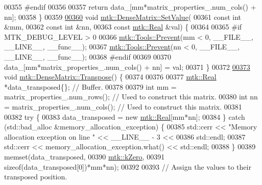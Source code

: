 \begin{DoxyCode}
00355 \textcolor{preprocessor}{  #endif}
00356 
00357   \textcolor{keywordflow}{return} data\_[mm*matrix\_properties\_.num\_cols() + nn];
00358 \}
00359 
\hypertarget{mtk__dense__matrix_8cc_source_l00360}{}\hyperlink{classmtk_1_1DenseMatrix_ae0f873a6d3a734da467cafb817da64ae}{00360} \textcolor{keywordtype}{void}  \hyperlink{classmtk_1_1DenseMatrix_ae0f873a6d3a734da467cafb817da64ae}{mtk::DenseMatrix::SetValue}(
00361     \textcolor{keyword}{const} \textcolor{keywordtype}{int} &mm,
00362     \textcolor{keyword}{const} \textcolor{keywordtype}{int} &nn,
00363     \textcolor{keyword}{const} \hyperlink{group__c01-roots_gac080bbbf5cbb5502c9f00405f894857d}{mtk::Real} &val) \{
00364 
00365 \textcolor{preprocessor}{  #if MTK\_DEBUG\_LEVEL > 0}
00366   \hyperlink{classmtk_1_1Tools_afe5bb096309258e2e72503fd7b41c7e0}{mtk::Tools::Prevent}(mm < 0, \_\_FILE\_\_, \_\_LINE\_\_, \_\_func\_\_);
00367   \hyperlink{classmtk_1_1Tools_afe5bb096309258e2e72503fd7b41c7e0}{mtk::Tools::Prevent}(nn < 0, \_\_FILE\_\_, \_\_LINE\_\_, \_\_func\_\_);
00368 \textcolor{preprocessor}{  #endif}
00369 
00370   data\_[mm*matrix\_properties\_.num\_cols() + nn] = val;
00371 \}
00372 
\hypertarget{mtk__dense__matrix_8cc_source_l00373}{}\hyperlink{classmtk_1_1DenseMatrix_a71d9c07ca66e88d97d1fd5012f43138b}{00373} \textcolor{keywordtype}{void} \hyperlink{classmtk_1_1DenseMatrix_a71d9c07ca66e88d97d1fd5012f43138b}{mtk::DenseMatrix::Transpose}() \{
00374 
00376 
00377   \hyperlink{group__c01-roots_gac080bbbf5cbb5502c9f00405f894857d}{mtk::Real} *data\_transposed\{\}; \textcolor{comment}{// Buffer.}
00378 
00379   \textcolor{keywordtype}{int} mm = matrix\_properties\_.num\_rows(); \textcolor{comment}{// Used to construct this matrix.}
00380   \textcolor{keywordtype}{int} nn = matrix\_properties\_.num\_cols(); \textcolor{comment}{// Used to construct this matrix.}
00381 
00382   \textcolor{keywordflow}{try} \{
00383     data\_transposed = \textcolor{keyword}{new} \hyperlink{group__c01-roots_gac080bbbf5cbb5502c9f00405f894857d}{mtk::Real}[mm*nn];
00384   \} \textcolor{keywordflow}{catch} (std::bad\_alloc &memory\_allocation\_exception) \{
00385     std::cerr << \textcolor{stringliteral}{"Memory allocation exception on line "} << \_\_LINE\_\_ - 3 <<
00386       std::endl;
00387     std::cerr << memory\_allocation\_exception.what() << std::endl;
00388   \}
00389   memset(data\_transposed,
00390          \hyperlink{group__c01-roots_ga59a451a5fae30d59649bcda274fea271}{mtk::kZero},
00391          \textcolor{keyword}{sizeof}(data\_transposed[0])*mm*nn);
00392 
00393   \textcolor{comment}{// Assign the values to their transposed position.}

\end{DoxyCode}
